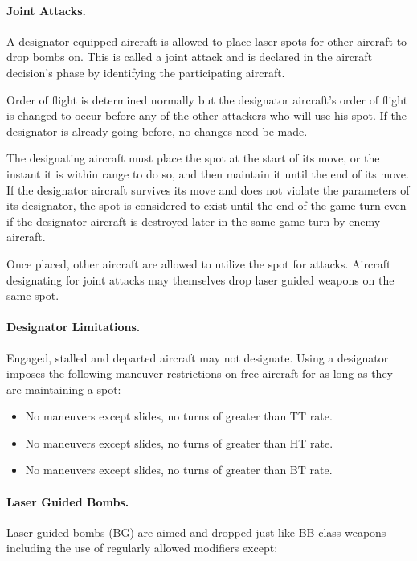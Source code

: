 
\paragraph{Joint Attacks.} A designator equipped aircraft is allowed to place laser spots for other aircraft to drop bombs on. This is called a joint attack and is declared in the aircraft decision's phase by identifying the participating aircraft.

Order of flight is determined normally but the designator aircraft's order of flight is changed to occur before any of the other attackers who will use his spot. If the designator is already going before, no changes need be made.

The designating aircraft must place the spot at the start of its move, or the instant it is within range to do so, and then maintain it until the end of its move. If the designator aircraft survives its move and does not violate the parameters of its designator, the spot is considered to exist until the end of the game-turn even if the designator aircraft is destroyed later in the same game turn by enemy aircraft.

Once placed, other aircraft are allowed to utilize the spot for attacks. Aircraft designating for joint attacks may themselves drop laser guided weapons on the same spot.

\paragraph{Designator Limitations.} Engaged, stalled and departed aircraft may not designate. Using a designator imposes the following maneuver restrictions on free aircraft for as long as they are maintaining a spot:

\begin{itemize}
    \item{} No maneuvers except slides, no turns of greater than TT rate.

    \item{} No maneuvers except slides, no turns of greater than HT rate.

    \item{} No maneuvers except slides, no turns of greater than BT rate.
\end{itemize}


\paragraph{Laser Guided Bombs.} Laser guided bombs (BG) are aimed and dropped just like BB class weapons including the use of regularly allowed modifiers except:

